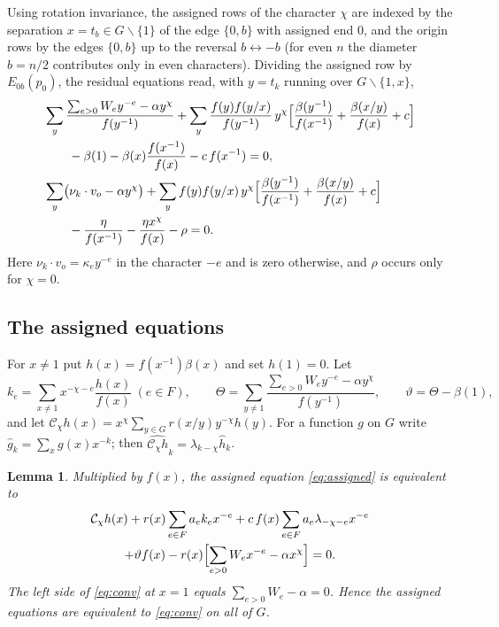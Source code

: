 \documentclass{amsart}
\newtheorem{lemma}[theorem]{Lemma}
\theoremstyle{definition}
\theoremstyle{remark}
\numberwithin{equation}{section}
\begin{document}
Using rotation invariance, the assigned rows of the character $\chi$ are indexed by
the separation $x=t_b\in G\smallsetminus\{1\}$ of the edge $\{0,b\}$ with assigned end
$0$, and the origin rows by the edges $\{0,b\}$ up to the reversal
$b\leftrightarrow-b$ (for even $n$ the diameter $b=n/2$ contributes only in even
characters). Dividing the assigned row by $E_{0b}(p_0)$, the residual equations read,
with $y=t_k$ running over $G\smallsetminus\{1,x\}$,
\begin{align}
  &\sum_{y}\frac{\sum_{e>0}W_ey^{-e}-\alpha y^\chi}{f(y^{-1})}
   +\sum_y\frac{f(y)f(y/x)}{f(y^{-1})}\,y^\chi\Bigl[\frac{\beta(y^{-1})}{f(x^{-1})}
   +\frac{\beta(x/y)}{f(x)}+c\Bigr]\notag\\
  &\qquad-\beta(1)-\beta(x)\frac{f(x^{-1})}{f(x)}-c\,f(x^{-1})=0,\label{eq:assigned}\\
  &\sum_y\bigl(\nu_k\cdot v_o-\alpha y^\chi\bigr)
   +\sum_yf(y)f(y/x)\,y^\chi\Bigl[\frac{\beta(y^{-1})}{f(x^{-1})}
   +\frac{\beta(x/y)}{f(x)}+c\Bigr]\notag\\
  &\qquad-\frac{\eta}{f(x^{-1})}-\frac{\eta x^\chi}{f(x)}-\rho=0 .\label{eq:origin}
\end{align}
Here $\nu_k\cdot v_o=\kappa_ey^{-e}$ in the character $-e$ and is zero otherwise, and
$\rho$ occurs only for $\chi=0$.

\subsection{The assigned equations}
For $x\ne1$ put $h(x)=f(x^{-1})\beta(x)$ and set $h(1)=0$. Let
\[
  k_e=\sum_{x\ne1}x^{-\chi-e}\frac{h(x)}{f(x)}\ (e\in F),\qquad
  \Theta=\sum_{y\ne1}\frac{\sum_{e>0}W_ey^{-e}-\alpha y^\chi}{f(y^{-1})},\qquad
  \vartheta=\Theta-\beta(1),
\]
and let $\mathcal C_\chi h(x)=x^\chi\sum_{y\in G}r(x/y)y^{-\chi}h(y)$. For a function
$g$ on $G$ write $\hat g_k=\sum_xg(x)x^{-k}$; then
$\widehat{\mathcal C_\chi h}_k=\lambda_{k-\chi}\hat h_k$.

\begin{lemma}\label{lem:convolution}
Multiplied by $f(x)$, the assigned equation \eqref{eq:assigned} is equivalent to
\begin{multline}\label{eq:conv}
  \mathcal C_\chi h(x)+r(x)\sum_{e\in F}a_ek_ex^{-e}
  +c\,f(x)\sum_{e\in F}a_e\lambda_{-\chi-e}x^{-e}\\
  +\vartheta f(x)-r(x)\Bigl[\sum_{e>0}W_ex^{-e}-\alpha x^\chi\Bigr]=0 .
\end{multline}
The left side of \eqref{eq:conv} at $x=1$ equals $\sum_{e>0}W_e-\alpha=0$. Hence the
assigned equations are equivalent to \eqref{eq:conv} on all of $G$.
\end{lemma}
\end{document}
